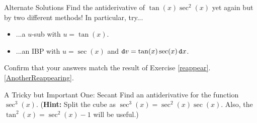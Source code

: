 \begin{exercise}{Alternate Solutions \Coffeecup \Coffeecup }
Find the antiderivative of $\tan(x)\sec^2(x)$ yet again but by two different methods!  In particular, try...
\begin{itemize}
\item ...a $u$-sub with $u=\tan(x)$. \vspace*{1.5in}
\item ...an IBP with $u=\sec(x)$ and $\mathop{}\!\mathtt{d} v = \tan(x)\sec(x) \mathop{}\!\mathtt{d} x$. \vspace*{1.5in}
\end{itemize}
Confirm that your answers match the result of Exercise \ref{reappear}.\ref{AnotherReappearing}.
\end{exercise}

\begin{exercise}{A Tricky but Important One: Secant  \Coffeecup \Coffeecup \Coffeecup }\label{seccubed}
  Find an antiderivative for the function $\sec^3(x)$.  ({\bf Hint:} Split the cube as $\sec^3(x)=\sec^2(x)\sec(x)$.  Also, the  $\tan^2(x)=\sec^2(x)-1$ will be useful.)
\end{exercise}
